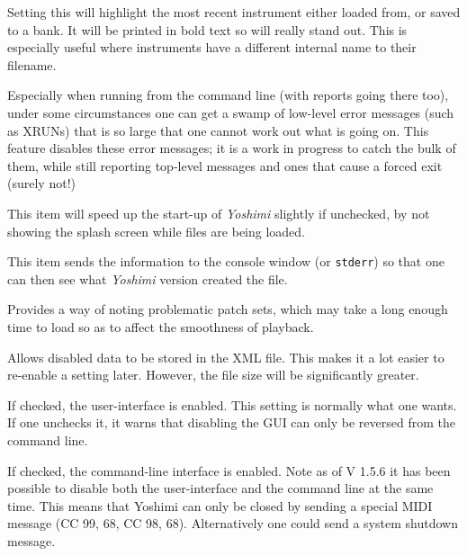   \setcounter{ItemCounter}{0}      %
   Setting this will highlight the most recent instrument either loaded from, or saved to a bank. It will be printed in bold text so will really stand out. This is especially useful where instruments have a different internal name to their filename.

   Especially when running from the command line (with reports going there
   too), under some circumstances one can get a swamp of low-level error
   messages (such as XRUNs) that is so large that one cannot work out what is
   going on. This feature disables these error messages; it is a work in
   progress to catch the bulk of them, while still reporting top-level messages
   and ones that cause a forced exit (surely not!)

   This item will speed up the start-up of \textsl{Yoshimi} slightly
   if unchecked, by not showing the splash screen while files are being loaded.

   This item sends the information to the console window
   (or \texttt{stderr}) so that
   one can then see what \textsl{Yoshimi}
   version created the file.

   Provides a way of noting problematic patch sets, which may take a long
   enough time to load so as to affect the smoothness of playback.

    Allows disabled data
   to be stored in the XML file. This makes it a lot easier to re-enable a setting
   later. However, the file size will be significantly greater.

   If checked, the user-interface is enabled.  This setting is normally what one
   wants.  If one unchecks it, it warns that disabling the GUI
   can only be reversed from the command line.

   If checked, the command-line interface is enabled.
   Note as of V 1.5.6 it has been possible to disable both the user-interface and
   the command line at the same time. This means that Yoshimi can only be closed
   by sending a special MIDI message (CC 99, 68, CC 98, 68). Alternatively one
   could send a system shutdown message.

